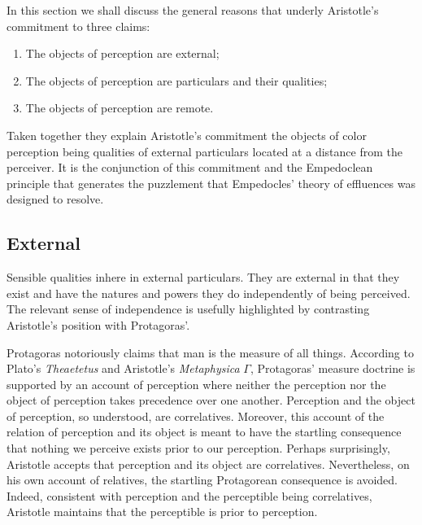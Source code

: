 In this section we shall discuss the general reasons that underly Aristotle's commitment to three claims:
\begin{enumerate}[(1)]
    \item The objects of perception are external;
    \item The objects of perception are particulars and their qualities;
    \item The objects of perception are remote.
\end{enumerate}
Taken together they explain Aristotle's commitment the objects of color perception being qualities of external particulars located at a distance from the perceiver. It is the conjunction of this commitment and the Empedoclean principle that generates the puzzlement that Empedocles' theory of effluences was designed to resolve.

\subsection{External} %
\label{sub:external}

Sensible qualities inhere in external particulars. They are external in that they exist and have the natures and powers they do independently of being perceived. The relevant sense of independence is usefully highlighted by contrasting Aristotle's position with Protagoras'.

Protagoras notoriously claims that man is the measure of all things. According to Plato's \emph{Theaetetus} and Aristotle's \emph{Metaphysica} \( \Gamma \), Protagoras' measure doctrine is supported by an account of perception where neither the perception nor the object of perception takes precedence over one another. Perception and the object of perception, so understood, are correlatives. Moreover, this account of the relation of perception and its object is meant to have the startling consequence that nothing we perceive exists prior to our perception. Perhaps surprisingly, Aristotle accepts that perception and its object are correlatives. Nevertheless, on his own account of relatives, the startling Protagorean consequence is avoided. Indeed, consistent with perception and the perceptible being correlatives, Aristotle maintains that the perceptible is prior to perception.

